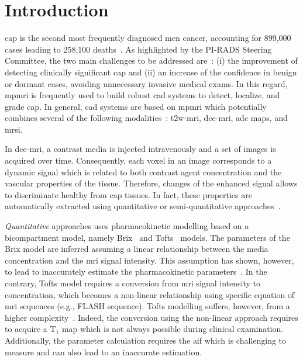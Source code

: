 \section{Introduction}

\Ac{cap} is the second most frequently diagnosed men cancer, accounting for 899,000 cases leading to 258,100 deaths~\citep{ferlay2010estimates}.
As highlighted by the PI-RADS Steering Committee, the two main challenges to be addressed are~\citep{weinreb2016pi}:
(i) the improvement of detecting clinically significant \ac{cap} and
(ii) an increase of the confidence in benign or dormant cases, avoiding unnecessary invasive medical exams.
In this regard, \ac{mpmri} is frequently used to build robust \ac{cad} systems to detect, localize, and grade \ac{cap}.
In general, \ac{cad} systems are based on \ac{mpmri} which potentially combines several of the following modalities~\citep{lemaitre2015computer}: \ac{t2w}-\ac{mri}, \ac{dce}-\ac{mri}, \ac{adc} maps, and \ac{mrsi}.

In \ac{dce}-\ac{mri}, a contrast media is injected intravenously and a set of images is acquired over time.
Consequently, each voxel in an image corresponds to a dynamic signal which is related to both contrast agent concentration and the vascular properties of the tissue.
Therefore, changes of the enhanced signal allows to discriminate healthy from \ac{cap} tissues.
In fact, these properties are automatically extracted using quantitative or semi-quantitative approaches~\citep{lemaitre2015computer}.

\emph{Quantitative} approaches uses pharmacokinetic modelling based on a bicompartment model, namely Brix~\citep{brix1991pharmacokinetic} and Tofts~\citep{tofts1995quantitative} models.
The parameters of the Brix model are inferred assuming a linear relationship between the media concentration and the \ac{mri} signal intensity.
This assumption has shown, however, to lead to inaccurately estimate the pharmacokinetic parameters~\citep{heilmann2006determination}.
In the contrary, Tofts model requires a conversion from \ac{mri} signal intensity to concentration, which becomes a non-linear relationship using specific equation of \ac{mri} sequences (e.g., FLASH sequence).
Tofts modelling suffers, however, from a higher complexity~\citep{gliozzi2011phenomenological}.
Indeed, the conversion using the non-linear approach requires to acquire a T$_1$ map which is not always possible during clinical examination.
Additionally, the parameter calculation requires the \ac{aif} which is challenging to measure and can also lead to an inaccurate estimation.

